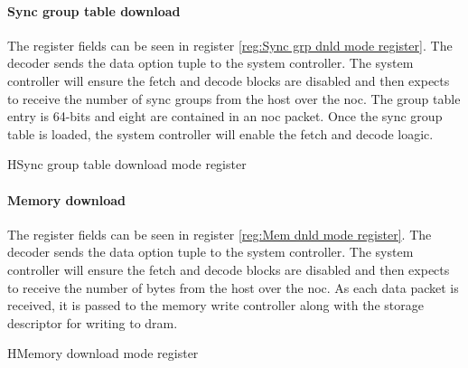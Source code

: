 \paragraph{Sync group table download}

The register fields can be seen in register \ref{reg:Sync grp dnld mode register}.
The decoder sends the data option tuple to the system controller.
The system controller will ensure the fetch and decode blocks are disabled and then expects to receive the number of sync groups from the host over the \ac{noc}.
The group table entry is 64-bits and eight are contained in an \ac{noc} packet.
Once the sync group table is loaded, the system controller will enable the fetch and decode loagic.
\begin{register}{H}{Sync group table download mode register}{}%
  \label{reg:Sync grp dnld mode register}
  \vspace{-10pt}
\end{register}

\paragraph{Memory download}
\label{sec:Memory download reg}

The register fields can be seen in register \ref{reg:Mem dnld mode register}.
The decoder sends the data option tuple to the system controller.
The system controller will ensure the fetch and decode blocks are disabled and then expects to receive the number of bytes from the host over the \ac{noc}.
As each data packet is received, it is passed to the memory write controller along with the storage descriptor for writing to \ac{dram}.
\begin{register}{H}{Memory download mode register}{}%
  \label{reg:Mem dnld mode register}
  \vspace{-10pt}
\end{register}

